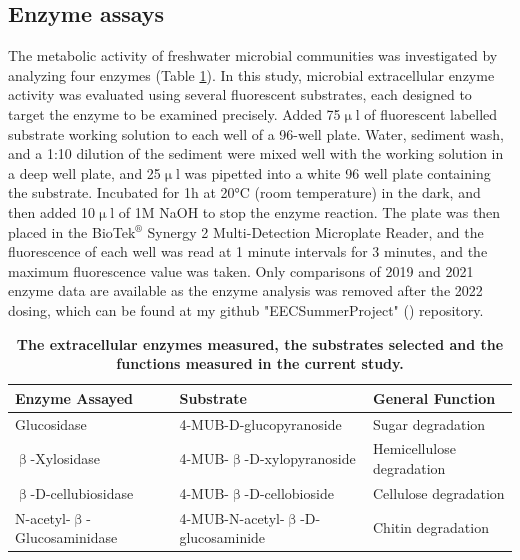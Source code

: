 \subsection{Enzyme assays}\label{section:Enzyme}

The metabolic activity of freshwater microbial communities was investigated by analyzing four enzymes (Table \ref{tab:Enzyme}). In this study, microbial extracellular enzyme activity was evaluated using several fluorescent substrates, each designed to target the enzyme to be examined precisely. Added 75$\upmu$l of fluorescent labelled substrate working solution to each well of a 96-well plate. Water, sediment wash, and a 1:10 dilution of the sediment were mixed well with the working solution in a deep well plate, and 25$\upmu$l was pipetted into a white 96 well plate containing the substrate. Incubated for 1h at 20°C (room temperature) in the dark, and then added 10$\upmu$l of 1M NaOH to stop the enzyme reaction. The plate was then placed in the BioTek$^\circledR$ Synergy 2 Multi-Detection Microplate Reader, and the fluorescence of each well was read at 1 minute intervals for 3 minutes, and the maximum fluorescence value was taken. Only comparisons of 2019 and 2021 enzyme data are available as the enzyme analysis was removed after the 2022 dosing, which can be found at my github "EECSummerProject"  (\href{https://github.com/ChuxuanJi/EECSummerProject/tree/master/Sandbox}{}) repository.

\begin{table}[H]
    \caption{\bf The extracellular enzymes measured, the substrates selected and the functions measured in the current study.}
    \centering
    \begin{tabular}{ |m{4.9cm}<{\centering}|m{6.3cm}<{\centering}|m{4.7cm}<{\centering}| } 
    \hline
     Enzyme Assayed & Substrate & General Function \\
     \hline
     Glucosidase & 4-MUB-D-glucopyranoside & Sugar degradation \\ 
     $\upbeta$-Xylosidase & 4-MUB-$\upbeta$-D-xylopyranoside & Hemicellulose degradation \\
     $\upbeta$-D-cellubiosidase & 4-MUB-$\upbeta$-D-cellobioside & Cellulose degradation \\
     N-acetyl-$\upbeta$-Glucosaminidase & 4-MUB-N-acetyl-$\upbeta$-D-glucosaminide & Chitin degradation \\
    \hline
    \end{tabular}    
    \label{tab:Enzyme}
\end{table}

